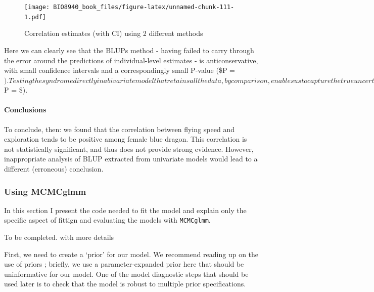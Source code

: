 \documentclass[
  12pt,
]{book}
\begin{document}
\begin{figure}
\centering
\texttt{[image: BIO8940\_book\_files/figure-latex/unnamed-chunk-111-1.pdf]}
\caption{\label{fig:unnamed-chunk-111}Correlation estimates (with CI) using 2 different methods}
\end{figure}

Here we can clearly see that the BLUPs method - having failed to carry through the error around the predictions of individual-level estimates - is anticonservative, with small confidence intervals and a correspondingly small P-value (\$P = \(). Testing the syndrome directly in a bivariate model that retains all the data, by comparison, enables us to capture the true uncertainty about the estimate of the correlation. This is reflected in the larger confidence intervals and, in this case, the non-significant P-value (\)P = \$).

\hypertarget{conclusions-1}{%
\paragraph{Conclusions}\label{conclusions-1}}

To conclude, then: we found that the correlation between flying speed and exploration tends to be positive among female blue dragon. This correlation is not statistically significant, and thus does not provide strong evidence. However, inappropriate analysis of BLUP extracted from univariate models would lead to a different (erroneous) conclusion.

\hypertarget{using-mcmcglmm}{%
\subsubsection{Using MCMCglmm}\label{using-mcmcglmm}}

In this section I present the code needed to fit the model and explain only the specific aspect of fittign and evaluating the models with \texttt{MCMCglmm}.

To be completed. with more details

First, we need to create a `prior' for our model. We recommend reading up on the use of priors \citep[see the course notes of \texttt{MCMCglmm}][]{R-MCMCglmm}; briefly, we use a parameter-expanded prior here that should be uninformative for our model. One of the model diagnostic steps that should be used later is to check that the model is robust to multiple prior specifications.
\end{document}

